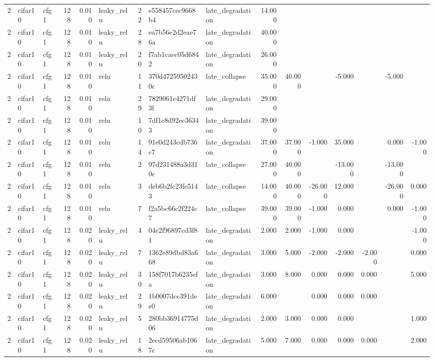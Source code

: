 \begin{table}[htbp]
{\begin{tabular}{@{}rllrrlrllrrrrrrr@{}}
2 & cifar10 & cfg1 & 128 & 0.010 & leaky\_relu & 22 & e558457cec9668b4 & late\_degradation & 14.000 &  &  &  &  &  &  \\
2 & cifar10 & cfg1 & 128 & 0.010 & leaky\_relu & 28 & ea7b56e2d2eae76a & late\_degradation & 40.000 &  &  &  &  &  &  \\
2 & cifar10 & cfg1 & 128 & 0.010 & leaky\_relu & 20 & f7ab1caec05d6842 & late\_degradation & 26.000 &  &  &  &  &  &  \\
2 & cifar10 & cfg1 & 128 & 0.010 & relu & 11 & 370d47259502430c & late\_collapse & 35.000 & 40.000 &  & -5.000 &  & -5.000 &  \\
2 & cifar10 & cfg1 & 128 & 0.010 & relu & 29 & 7829061c4271df3f & late\_degradation & 29.000 &  &  &  &  &  &  \\
2 & cifar10 & cfg1 & 128 & 0.010 & relu & 10 & 7df1c8d92ec36343 & late\_degradation & 39.000 &  &  &  &  &  &  \\
2 & cifar10 & cfg1 & 128 & 0.010 & relu & 14 & 91e0d243cdb736c7 & late\_degradation & 37.000 & 37.000 & -1.000 & 35.000 &  & 0.000 & -1.000 \\
2 & cifar10 & cfg1 & 128 & 0.010 & relu & 2 & 97d231488a3d310c & late\_collapse & 27.000 & 40.000 &  & -13.000 &  & -13.000 &  \\
2 & cifar10 & cfg1 & 128 & 0.010 & relu & 3 & deb6b2fc23fe5143 & late\_collapse & 14.000 & 40.000 & -26.000 & 12.000 &  & -26.000 & 0.000 \\
2 & cifar10 & cfg1 & 128 & 0.010 & relu & 7 & f2a5bc66c2f224c7 & late\_collapse & 39.000 & 39.000 & -1.000 & 0.000 &  & 0.000 & -1.000 \\
2 & cifar10 & cfg1 & 128 & 0.020 & leaky\_relu & 4 & 04e2f96897cd3f81 & late\_degradation & 2.000 & 2.000 & -1.000 & 0.000 &  &  & -1.000 \\
2 & cifar10 & cfg1 & 128 & 0.020 & leaky\_relu & 7 & 1362e89dbd83a668 & late\_degradation & 3.000 & 5.000 & -2.000 & -2.000 & -2.000 &  & 0.000 \\
2 & cifar10 & cfg1 & 128 & 0.020 & leaky\_relu & 30 & 158f7017b6235efa & late\_degradation & 3.000 & 8.000 & 0.000 & 0.000 & 0.000 &  & 5.000 \\
2 & cifar10 & cfg1 & 128 & 0.020 & leaky\_relu & 29 & 1b0007dcc391dee0 & late\_degradation & 6.000 &  & 0.000 & 0.000 & 0.000 &  &  \\
2 & cifar10 & cfg1 & 128 & 0.020 & leaky\_relu & 5 & 280bb36914775d06 & late\_degradation & 2.000 & 3.000 & 0.000 & 0.000 &  &  & 1.000 \\
2 & cifar10 & cfg1 & 128 & 0.020 & leaky\_relu & 18 & 2ecd59506ab1067c & late\_degradation & 5.000 & 7.000 & 0.000 & 0.000 & 0.000 &  & 2.000 \\

\end{tabular}}
\end{table}
